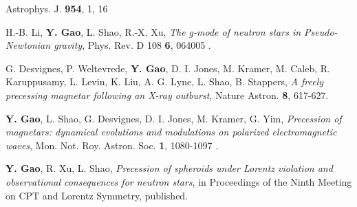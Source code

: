 \begin{etaremune}
  Astrophys. J. {\bf 954}, {1}, 16
  \item
  H.-B. Li, 
  {\bf Y. Gao}, 
  L. Shao, 
  R.-X. Xu, 
  {\it The g-mode of neutron stars in Pseudo-Newtonian gravity}, 
  Phys. Rev. D 108 {\bf 6}, 064005
  .
  \item
  G. Desvignes, 
  P. Weltevrede, 
  {\bf Y. Gao}, 
  D. I. Jones, 
  M. Kramer, 
  M. Caleb, 
  R. Karuppusamy, 
  L. Levin, 
  K. Liu, 
  A. G. Lyne, 
  L. Shao, 
  B. Stappers, 
  {\it A freely precessing magnetar following an X-ray outburst}, 
  Nature Astron. {\bf 8}, 617-627.
  \item  
  {\bf Y. Gao},
  L. Shao,
  G. Desvignes,
  D. I. Jones,
  M. Kramer,
  G. Yim,
  {\it Precession of magnetars: dynamical evolutions and modulations on polarized electromagnetic waves},
   Mon. Not. Roy. Astron. Soc. {\bf 1}, 1080-1097 
  .
  \item 
  {\bf Y. Gao}, 
  R. Xu, 
  L. Shao, 
  {\it Precession of spheroids under Lorentz violation and observational consequences for neutron stars}, 
  in Proceedings of the Ninth Meeting on CPT and Lorentz Symmetry, published.


\end{etaremune}
